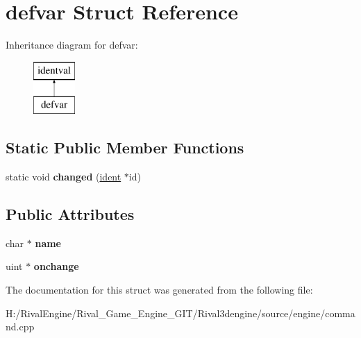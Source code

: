 \hypertarget{structdefvar}{}\section{defvar Struct Reference}
\label{structdefvar}
Inheritance diagram for defvar\+:\begin{figure}[H]
\begin{center}
\leavevmode
\includegraphics[height=2.000000cm]{structdefvar}
\end{center}
\end{figure}
\subsection*{Static Public Member Functions}
\begin{DoxyCompactItemize}
\item 
\mbox{\label{structdefvar_ae876bdc4c67af25508a914d3230d93cd}} 
static void {\bfseries changed} (\hyperlink{structident}{ident} $\ast$id)
\end{DoxyCompactItemize}
\subsection*{Public Attributes}
\begin{DoxyCompactItemize}
\item 
\mbox{\label{structdefvar_aedc852f6371ffd13af82b7e045cc7e33}} 
char $\ast$ {\bfseries name}
\item 
\mbox{\label{structdefvar_a46940060736bcc3cd2a74b24d2925cf0}} 
uint $\ast$ {\bfseries onchange}
\end{DoxyCompactItemize}


The documentation for this struct was generated from the following file\+:\begin{DoxyCompactItemize}
\item 
H\+:/\+Rival\+Engine/\+Rival\+\_\+\+Game\+\_\+\+Engine\+\_\+\+G\+I\+T/\+Rival3dengine/source/engine/command.\+cpp\end{DoxyCompactItemize}
